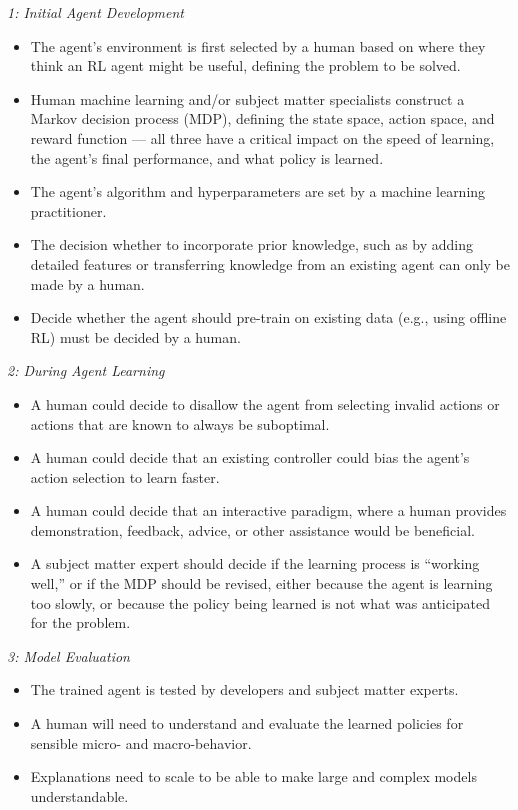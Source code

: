 \documentclass[twoside,11pt]{article}
\begin{document}
\noindent
\emph{1: Initial Agent Development}
    \begin{itemize}
        \item The agent's environment is first selected by a human based on where they think an RL agent might be useful, defining the problem to be solved.
        \item Human machine learning and/or subject matter specialists construct a Markov decision process (MDP), defining the state space, action space, and reward function --- all three have a critical impact on the speed of learning, the agent's final performance, and what policy is learned. 
        \item The agent's algorithm and hyperparameters are set by a machine learning practitioner. 
        \item The decision whether to incorporate prior knowledge, such as by adding detailed features or transferring knowledge from an existing agent 
        can only be made by a human. 
        \item Decide whether the agent should pre-train on existing data (e.g., using offline RL) must be decided by a human.
    \end{itemize}
\noindent
\emph{2: During Agent Learning}
    \begin{itemize}
        \item A human could decide to disallow the agent from selecting invalid actions or actions that are known to always be suboptimal.
        \item A human could decide that an existing controller could bias the agent's action selection to learn faster.
        \item A human could decide that an interactive paradigm, where a human provides demonstration, feedback, advice, or other assistance would be beneficial.
        \item A subject matter expert should decide if the learning process is ``working well,'' or if the MDP should be revised, either because the agent is learning too slowly, or because the policy being learned is not what was anticipated for the problem.
    \end{itemize}
\noindent
\emph{3: Model Evaluation}
    \begin{itemize}
        \item The trained agent is tested by developers and subject matter experts.
        \item A human will need to understand and evaluate the learned policies for sensible micro- and macro-behavior.
        \item Explanations need to scale to be able to make large and complex models understandable.
    \end{itemize}
\end{document}

